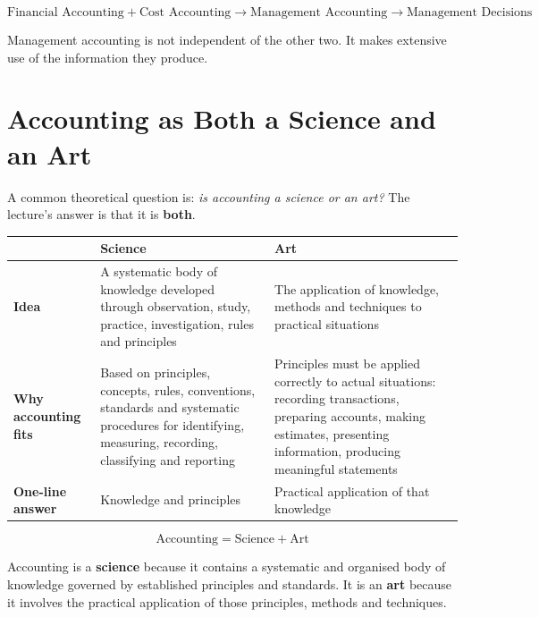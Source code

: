 \documentclass[11pt,a4paper]{article}
\begin{document}
\[
\boxed{\text{Financial Accounting}+\text{Cost Accounting}\rightarrow\text{Management Accounting}\rightarrow\text{Management Decisions}}
\]

Management accounting is not independent of the other two. It makes extensive use of the
information they produce.

\section{Accounting as Both a Science and an Art}

A common theoretical question is: \emph{is accounting a science or an art?} The lecture's answer is
that it is \textbf{both}.

\begin{center}
\small
\begin{tabularx}{\textwidth}{@{}l Y Y@{}}
\toprule
{} & \textbf{Science} & \textbf{Art}\\
\midrule
\textbf{Idea} & A systematic body of knowledge developed through observation, study, practice, investigation, rules and principles & The application of knowledge, methods and techniques to practical situations\\
\textbf{Why accounting fits} & Based on principles, concepts, rules, conventions, standards and systematic procedures for identifying, measuring, recording, classifying and reporting & Principles must be applied correctly to actual situations: recording transactions, preparing accounts, making estimates, presenting information, producing meaningful statements\\
\textbf{One-line answer} & Knowledge and principles & Practical application of that knowledge\\
\bottomrule
\end{tabularx}
\end{center}

\[
\boxed{\text{Accounting}=\text{Science}+\text{Art}}
\]

\begin{keybox}
Accounting is a \textbf{science} because it contains a systematic and organised body of knowledge
governed by established principles and standards. It is an \textbf{art} because it involves the
practical application of those principles, methods and techniques.
\end{keybox}
\end{document}
